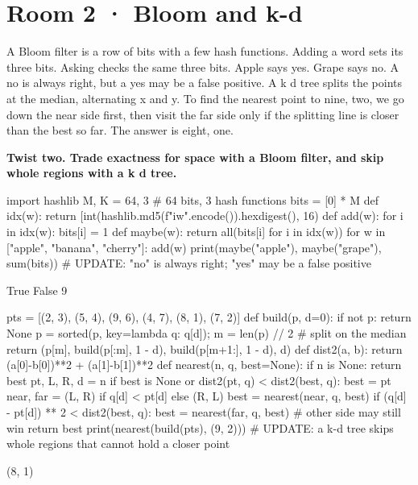\documentclass[11pt,a4paper]{report}
\begin{document}
\section*{Room 2 · Bloom and k-d}
A Bloom filter is a row of bits with a few hash functions. Adding a word sets its three bits. Asking checks the same three bits. Apple says yes. Grape says no. A no is always right, but a yes may be a false positive. A k d tree splits the points at the median, alternating x and y. To find the nearest point to nine, two, we go down the near side first, then visit the far side only if the splitting line is closer than the best so far. The answer is eight, one.
\begin{tcolorbox}[colback=yellow!12,colframe=orange!70!black,boxrule=0.4pt,left=4pt,right=4pt,top=2pt,bottom=2pt]\textbf{Twist two. Trade exactness for space with a Bloom filter, and skip whole regions with a k d tree.}\end{tcolorbox}
\begin{Code}
import hashlib
M, K = 64, 3                                # 64 bits, 3 hash functions
bits = [0] * M
def idx(w): return [int(hashlib.md5(f"{i}{w}".encode()).hexdigest(), 16) %
def add(w):
    for i in idx(w): bits[i] = 1
def maybe(w): return all(bits[i] for i in idx(w))
for w in ["apple", "banana", "cherry"]: add(w)
print(maybe("apple"), maybe("grape"), sum(bits))
# UPDATE: "no" is always right; "yes" may be a false positive
\end{Code}
\begin{Out}
True False 9
\end{Out}
\begin{Code}
pts = [(2, 3), (5, 4), (9, 6), (4, 7), (8, 1), (7, 2)]
def build(p, d=0):
    if not p: return None
    p = sorted(p, key=lambda q: q[d]); m = len(p) // 2       # split on the median
    return (p[m], build(p[:m], 1 - d), build(p[m+1:], 1 - d), d)
def dist2(a, b): return (a[0]-b[0])**2 + (a[1]-b[1])**2
def nearest(n, q, best=None):
    if n is None: return best
    pt, L, R, d = n
    if best is None or dist2(pt, q) < dist2(best, q): best = pt
    near, far = (L, R) if q[d] < pt[d] else (R, L)
    best = nearest(near, q, best)
    if (q[d] - pt[d]) ** 2 < dist2(best, q): best = nearest(far, q, best)   # other side may still win
    return best
print(nearest(build(pts), (9, 2)))
# UPDATE: a k-d tree skips whole regions that cannot hold a closer point
\end{Code}
\begin{Out}
(8, 1)
\end{Out}
\end{document}
